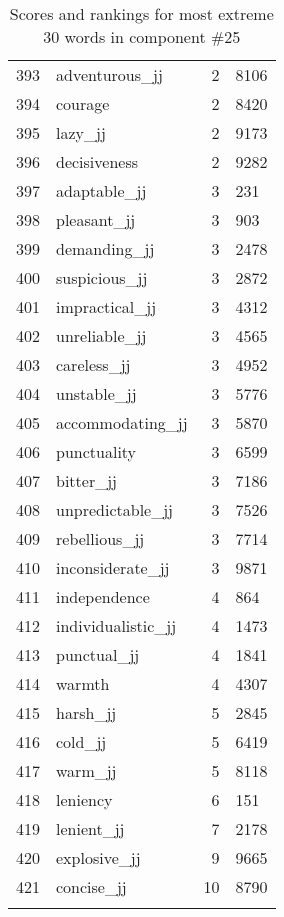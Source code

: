 \begin{longtable}[!htbp]{| rlr@{.}l |}
    393 & adventurous\_jj & 2 & 8106 \\
    394 & courage & 2 & 8420 \\
    395 & lazy\_jj & 2 & 9173 \\
    396 & decisiveness & 2 & 9282 \\
    397 & adaptable\_jj & 3 & 231 \\
    398 & pleasant\_jj & 3 & 903 \\
    399 & demanding\_jj & 3 & 2478 \\
    400 & suspicious\_jj & 3 & 2872 \\
    401 & impractical\_jj & 3 & 4312 \\
    402 & unreliable\_jj & 3 & 4565 \\
    403 & careless\_jj & 3 & 4952 \\
    404 & unstable\_jj & 3 & 5776 \\
    405 & accommodating\_jj & 3 & 5870 \\
    406 & punctuality & 3 & 6599 \\
    407 & bitter\_jj & 3 & 7186 \\
    408 & unpredictable\_jj & 3 & 7526 \\
    409 & rebellious\_jj & 3 & 7714 \\
    410 & inconsiderate\_jj & 3 & 9871 \\
    411 & independence & 4 & 864 \\
    412 & individualistic\_jj & 4 & 1473 \\
    413 & punctual\_jj & 4 & 1841 \\
    414 & warmth & 4 & 4307 \\
    415 & harsh\_jj & 5 & 2845 \\
    416 & cold\_jj & 5 & 6419 \\
    417 & warm\_jj & 5 & 8118 \\
    418 & leniency & 6 & 151 \\
    419 & lenient\_jj & 7 & 2178 \\
    420 & explosive\_jj & 9 & 9665 \\
    421 & concise\_jj & 10 & 8790 \\
    \hline
    \caption{Scores and rankings for most extreme 30 words in component \#25} \\
\end{longtable}
